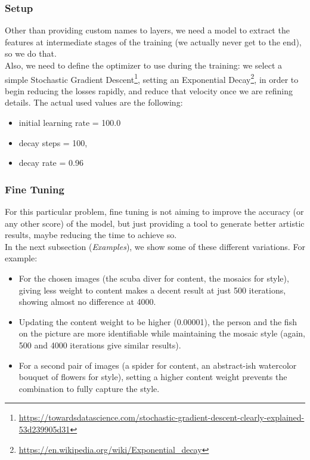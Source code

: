 \subsubsection{Setup}
Other than providing custom names to layers, we need a model to extract the features at intermediate stages of the training (we actually never get to the end), so we do that.\\
Also, we need to define the optimizer to use during the training: we select a simple Stochastic Gradient Descent\footnote{\href{https://towardsdatascience.com/stochastic-gradient-descent-clearly-explained-53d239905d31}{https://towardsdatascience.com/stochastic-gradient-descent-clearly-explained-53d239905d31}},
setting an Exponential Decay\footnote{\href{https://en.wikipedia.org/wiki/Exponential\_decay}{https://en.wikipedia.org/wiki/Exponential\_decay}},
in order to begin reducing the losses rapidly, and reduce that velocity once we are refining details.
The actual used values are the following:
\begin{itemize}
    \item initial learning rate = 100.0
    \item decay steps = 100,
    \item decay rate = 0.96
\end{itemize}
\subsubsection{Fine Tuning}
For this particular problem, fine tuning is not aiming to improve the accuracy (or any other score) of the model,
but just providing a tool to generate better artistic results, maybe reducing the time to achieve so.\\
In the next subsection (\emph{Examples}), we show some of these different variations. For example:
\begin{itemize}
    \item For the chosen images (the scuba diver for content, the mosaics for style), giving less weight to content makes a decent result at just 500 iterations, showing almost no difference at 4000.
    \item Updating the content weight to be higher (0.00001), the person and the fish on the picture are more identifiable while maintaining the mosaic style (again, 500 and 4000 iterations give similar results).
    \item For a second pair of images (a spider for content, an abstract-ish watercolor bouquet of flowers for style), setting a higher content weight prevents the combination to fully capture the style.
\end{itemize}

